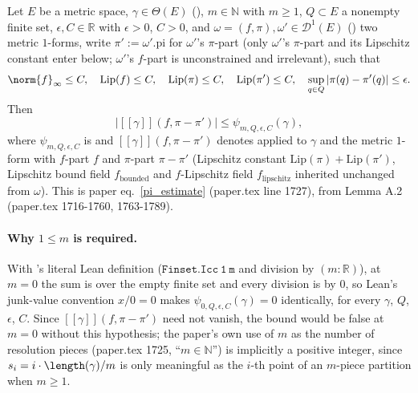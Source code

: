 \begin{lemma}
  Let $E$ be a metric space, $\gamma \in \Theta(E)$ (), $m \in \mathbb{N}$ with
  $m \ge 1$, $Q \subset E$ a nonempty finite set, $\epsilon,C \in \mathbb{R}$ with $\epsilon>0$,
  $C>0$, and $\omega=(f,\pi), \omega' \in \mathcal{D}^1(E)$ () two metric $1$-forms,
  write $\pi' := \omega'.\mathrm{pi}$ for $\omega'$'s $\pi$-part (only $\omega'$'s $\pi$-part and
  its Lipschitz constant enter below; $\omega'$'s $f$-part is unconstrained and irrelevant), such
  that
  \[
    \norm{f}_\infty \le C, \quad \mathrm{Lip}(f) \le C, \quad \mathrm{Lip}(\pi) \le C, \quad
    \mathrm{Lip}(\pi') \le C, \quad \sup_{q \in Q} |\pi(q)-\pi'(q)| \le \epsilon
    .
  \]
  Then
  \[
    \bigl| [[\gamma]](f,\pi-\pi') \bigr| \le \psi_{m,Q,\epsilon,C}(\gamma)
    ,
  \]
  where $\psi_{m,Q,\epsilon,C}$ is  and $[[\gamma]](f,\pi-\pi')$ denotes
   applied to $\gamma$ and the metric $1$-form with $f$-part $f$ and
  $\pi$-part $\pi-\pi'$ (Lipschitz constant $\mathrm{Lip}(\pi)+\mathrm{Lip}(\pi')$, Lipschitz
  bound field $f_{\text{bounded}}$ and $f$-Lipschitz field $f_{\text{lipschitz}}$ inherited
  unchanged from $\omega$). This is paper eq.~\eqref{pi_estimate} (paper.tex line 1727), from
  Lemma A.2 (paper.tex 1716-1760, 1763-1789).

  \paragraph{Why $1 \le m$ is required.} With 's literal Lean definition
  ($\mathtt{Finset.Icc\ 1\ m}$ and division by $(m:\mathbb{R})$), at $m=0$ the sum is over the
  empty finite set and every division is by $0$, so Lean's junk-value convention
  $x/0=0$ makes $\psi_{0,Q,\epsilon,C}(\gamma)=0$ identically, for every $\gamma$, $Q$, $\epsilon$,
  $C$. Since $[[\gamma]](f,\pi-\pi')$ need not vanish, the bound would be false at $m=0$ without
  this hypothesis; the paper's own use of $m$ as the number of resolution pieces (paper.tex 1725,
  ``$m \in \mathbb{N}$'') is implicitly a positive integer, since $s_i=i \cdot \length(\gamma)/m$ is
  only meaningful as the $i$-th point of an $m$-piece partition when $m \ge 1$.


\end{lemma}
